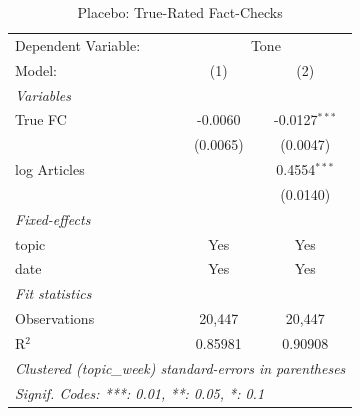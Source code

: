 
\begin{table}[htbp]
   \caption{\label{tab:placebo} Placebo: True-Rated Fact-Checks}
   \centering
   \begin{tabular}{lcc}
      \tabularnewline \midrule \midrule
      Dependent Variable: & \multicolumn{2}{c}{Tone}\\
      Model:       & (1)      & (2)\\  
      \midrule
      \emph{Variables}\\
      True FC      & -0.0060  & -0.0127$^{***}$\\   
                   & (0.0065) & (0.0047)\\   
      log Articles &          & 0.4554$^{***}$\\   
                   &          & (0.0140)\\   
      \midrule
      \emph{Fixed-effects}\\
      topic        & Yes      & Yes\\  
      date         & Yes      & Yes\\  
      \midrule
      \emph{Fit statistics}\\
      Observations & 20,447   & 20,447\\  
      R$^2$        & 0.85981  & 0.90908\\  
      \midrule \midrule
      \multicolumn{3}{l}{\emph{Clustered (topic\_week) standard-errors in parentheses}}\\
      \multicolumn{3}{l}{\emph{Signif. Codes: ***: 0.01, **: 0.05, *: 0.1}}\\
   \end{tabular}
\end{table}


